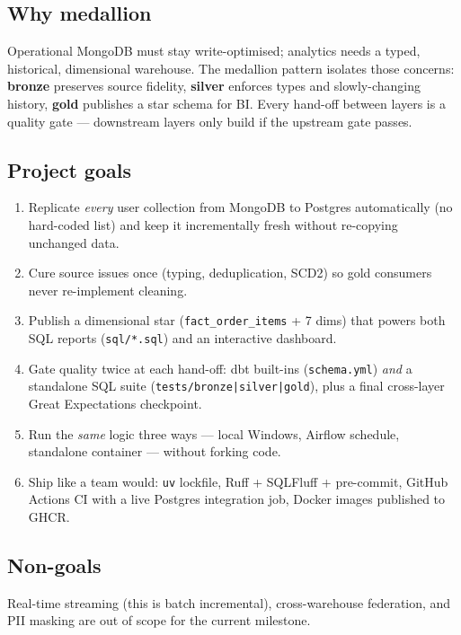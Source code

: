 \documentclass[11pt,a4paper]{article}
\begin{document}
\subsection{Why medallion}
Operational MongoDB must stay write-optimised; analytics needs a typed, historical, dimensional warehouse. The medallion pattern isolates those concerns: \textbf{bronze} preserves source fidelity, \textbf{silver} enforces types and slowly-changing history, \textbf{gold} publishes a star schema for BI. Every hand-off between layers is a quality gate — downstream layers only build if the upstream gate passes.

\subsection{Project goals}
\begin{enumerate}[leftmargin=1.4em,itemsep=2pt]
  \item Replicate \emph{every} user collection from MongoDB to Postgres automatically (no hard-coded list) and keep it incrementally fresh without re-copying unchanged data.
  \item Cure source issues once (typing, deduplication, SCD2) so gold consumers never re-implement cleaning.
  \item Publish a dimensional star (\texttt{fact\_order\_items} + 7 dims) that powers both SQL reports (\texttt{sql/*.sql}) and an interactive dashboard.
  \item Gate quality twice at each hand-off: dbt built-ins (\texttt{schema.yml}) \emph{and} a standalone SQL suite (\texttt{tests/bronze|silver|gold}), plus a final cross-layer Great Expectations checkpoint.
  \item Run the \emph{same} logic three ways — local Windows, Airflow schedule, standalone container — without forking code.
  \item Ship like a team would: \texttt{uv} lockfile, Ruff + SQLFluff + pre-commit, GitHub Actions CI with a live Postgres integration job, Docker images published to GHCR.
\end{enumerate}

\subsection{Non-goals}
Real-time streaming (this is batch incremental), cross-warehouse federation, and PII masking are out of scope for the current milestone.

\end{document}
